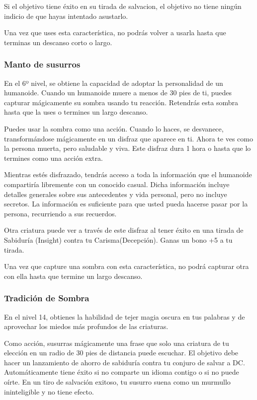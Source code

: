 \documentclass[a4paper,twocolumn,openany,10pt]{dndbook}
\begin{document}
Si el objetivo tiene éxito en su tirada de salvacion, el objetivo no tiene ningún indicio de que hayas intentado asustarlo.

Una vez que uses esta característica, no podrás volver a usarla hasta que terminas un descanso corto o largo. 

\subsubsection{Manto de susurros}
En el 6º nivel, se obtiene la capacidad de adoptar la personalidad de un humanoide. Cuando un humanoide muere a menos de 30 pies de ti,
puedes capturar mágicamente su sombra usando tu reacción. Retendrás esta sombra hasta que la uses o termines un largo descanso.

Puedes usar la sombra como una acción. Cuando lo haces, se desvanece, transformándose mágicamente en un disfraz que aparece en ti. Ahora te
ves como la persona muerta, pero saludable y viva. Este disfraz dura 1 hora o hasta que lo termines como una acción extra.

Mientras estés disfrazado, tendrás acceso a toda la información que el humanoide compartiría libremente con un conocido casual. Dicha
información incluye detalles generales sobre sus antecedentes y vida personal, pero no incluye secretos. La información es suficiente para
que usted pueda hacerse pasar por la persona, recurriendo a sus recuerdos.

Otra criatura puede ver a través de este disfraz al tener éxito en una tirada de Sabiduría (Insight) contra tu Carisma(Decepción). Ganas un
bono +5 a tu tirada.

Una vez que capture una sombra con esta característica, no podrá capturar otra con ella hasta que termine un largo descanso. 

\subsubsection{Tradición de Sombra}
En el nivel 14, obtienes la habilidad de tejer magia oscura en tus palabras y de aprovechar los miedos más profundos de las
criaturas.

Como acción, susurras mágicamente una frase que solo una criatura de tu elección en un radio de 30 pies de distancia puede
escuchar. El objetivo debe hacer un lanzamiento de ahorro de sabiduría contra tu conjuro de salvar a DC. Automáticamente tiene
éxito si no comparte un idioma contigo o si no puede oírte. En un tiro de salvación exitoso, tu susurro suena como un murmullo
ininteligible y no tiene efecto.
\end{document}
